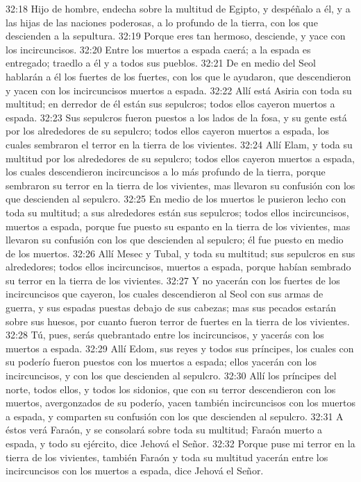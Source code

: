 32:18 Hijo de hombre, endecha sobre la multitud de Egipto, y despéñalo a él, y a las hijas de las naciones poderosas, a lo profundo de la tierra, con los que descienden a la sepultura.  
32:19 Porque eres tan hermoso, desciende, y yace con los incircuncisos.  
32:20 Entre los muertos a espada caerá; a la espada es entregado; traedlo a él y a todos sus pueblos.  
32:21 De en medio del Seol hablarán a él los fuertes de los fuertes, con los que le ayudaron, que descendieron y yacen con los incircuncisos muertos a espada.  
32:22 Allí está Asiria con toda su multitud; en derredor de él están sus sepulcros; todos ellos cayeron muertos a espada.  
32:23 Sus sepulcros fueron puestos a los lados de la fosa, y su gente está por los alrededores de su sepulcro; todos ellos cayeron muertos a espada, los cuales sembraron el terror en la tierra de los vivientes.  
32:24 Allí Elam, y toda su multitud por los alrededores de su sepulcro; todos ellos cayeron muertos a espada, los cuales descendieron incircuncisos a lo más profundo de la tierra, porque sembraron su terror en la tierra de los vivientes, mas llevaron su confusión con los que descienden al sepulcro.  
32:25 En medio de los muertos le pusieron lecho con toda su multitud; a sus alrededores están sus sepulcros; todos ellos incircuncisos, muertos a espada, porque fue puesto su espanto en la tierra de los vivientes, mas llevaron su confusión con los que descienden al sepulcro; él fue puesto en medio de los muertos.  
32:26 Allí Mesec y Tubal, y toda su multitud; sus sepulcros en sus alrededores; todos ellos incircuncisos, muertos a espada, porque habían sembrado su terror en la tierra de los vivientes.  
32:27 Y no yacerán con los fuertes de los incircuncisos que cayeron, los cuales descendieron al Seol con sus armas de guerra, y sus espadas puestas debajo de sus cabezas; mas sus pecados estarán sobre sus huesos, por cuanto fueron terror de fuertes en la tierra de los vivientes.  
32:28 Tú, pues, serás quebrantado entre los incircuncisos, y yacerás con los muertos a espada. 
32:29 Allí Edom, sus reyes y todos sus príncipes, los cuales con su poderío fueron puestos con los muertos a espada; ellos yacerán con los incircuncisos, y con los que descienden al sepulcro.  
32:30 Allí los príncipes del norte, todos ellos, y todos los sidonios, que con su terror descendieron con los muertos, avergonzados de su poderío, yacen también incircuncisos con los muertos a espada, y comparten su confusión con los que descienden al sepulcro.  
32:31 A éstos verá Faraón, y se consolará sobre toda su multitud; Faraón muerto a espada, y todo su ejército, dice Jehová el Señor.  
32:32 Porque puse mi terror en la tierra de los vivientes, también Faraón y toda su multitud yacerán entre los incircuncisos con los muertos a espada, dice Jehová el Señor. 


